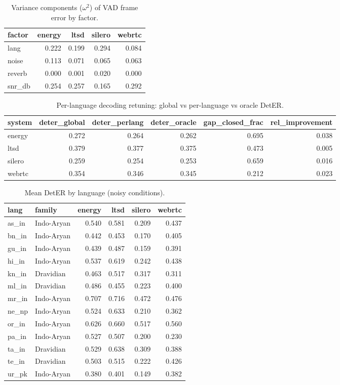 \begin{table}[t]
\centering
\caption{Variance components ($\omega^2$) of VAD frame error by factor.}
\label{tab:variance}
\begin{tabular}{lrrrr}
\toprule
factor & energy & ltsd & silero & webrtc \\
\midrule
lang & 0.222 & 0.199 & 0.294 & 0.084 \\
noise & 0.113 & 0.071 & 0.065 & 0.063 \\
reverb & 0.000 & 0.001 & 0.020 & 0.000 \\
snr_db & 0.254 & 0.257 & 0.165 & 0.292 \\
\bottomrule
\end{tabular}
\end{table}

\begin{table}[t]
\centering
\caption{Per-language decoding retuning: global vs per-language vs oracle DetER.}
\label{tab:hparam}
\begin{tabular}{lrrrrr}
\toprule
system & deter_global & deter_perlang & deter_oracle & gap_closed_frac & rel_improvement \\
\midrule
energy & 0.272 & 0.264 & 0.262 & 0.695 & 0.038 \\
ltsd & 0.379 & 0.377 & 0.375 & 0.473 & 0.005 \\
silero & 0.259 & 0.254 & 0.253 & 0.659 & 0.016 \\
webrtc & 0.354 & 0.346 & 0.345 & 0.212 & 0.023 \\
\bottomrule
\end{tabular}
\end{table}

\begin{table}[t]
\centering
\caption{Mean DetER by language (noisy conditions).}
\label{tab:langmeans}
\begin{tabular}{llrrrr}
\toprule
lang & family & energy & ltsd & silero & webrtc \\
\midrule
as_in & Indo-Aryan & 0.540 & 0.581 & 0.209 & 0.437 \\
bn_in & Indo-Aryan & 0.442 & 0.453 & 0.170 & 0.405 \\
gu_in & Indo-Aryan & 0.439 & 0.487 & 0.159 & 0.391 \\
hi_in & Indo-Aryan & 0.537 & 0.619 & 0.242 & 0.438 \\
kn_in & Dravidian & 0.463 & 0.517 & 0.317 & 0.311 \\
ml_in & Dravidian & 0.486 & 0.455 & 0.223 & 0.400 \\
mr_in & Indo-Aryan & 0.707 & 0.716 & 0.472 & 0.476 \\
ne_np & Indo-Aryan & 0.524 & 0.633 & 0.210 & 0.362 \\
or_in & Indo-Aryan & 0.626 & 0.660 & 0.517 & 0.560 \\
pa_in & Indo-Aryan & 0.527 & 0.507 & 0.200 & 0.230 \\
ta_in & Dravidian & 0.529 & 0.638 & 0.309 & 0.388 \\
te_in & Dravidian & 0.503 & 0.515 & 0.222 & 0.426 \\
ur_pk & Indo-Aryan & 0.380 & 0.401 & 0.149 & 0.382 \\
\bottomrule
\end{tabular}
\end{table}

